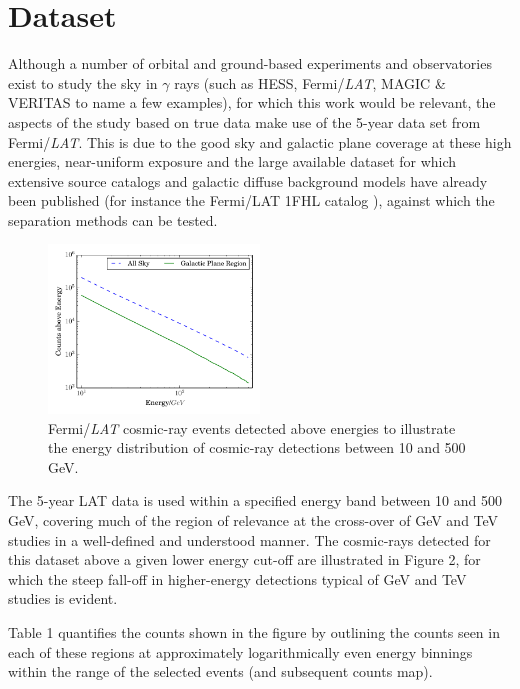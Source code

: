 \documentclass{PoS}
\begin{document}
\section{Dataset}
Although a number of orbital and ground-based experiments and observatories exist to study the sky in $\gamma$ rays (such as HESS, Fermi/\textit{LAT}, MAGIC \& VERITAS to name a few examples), for which this work would be relevant, the aspects of the study based on true data make use of the 5-year data set from Fermi/\textit{LAT}. This is due to the good sky and galactic plane coverage at these high energies, near-uniform exposure and the large available dataset for which extensive source catalogs and galactic diffuse background models have already been published (for instance the Fermi/LAT 1FHL catalog \cite{1fhl}), against which the separation methods can be tested.

\begin{figure}
  \begin{center}
      \includegraphics[width=0.5\textwidth]{figures/counts.pdf}
  \caption{Fermi/\textit{LAT} cosmic-ray events detected above energies to illustrate the energy distribution of cosmic-ray detections between 10 and 500 GeV.}
  \end{center}
\end{figure}

The 5-year LAT data is used within a specified energy band between 10 and 500 GeV, covering much of the region of relevance at the cross-over of GeV and TeV studies in a well-defined and understood manner. The cosmic-rays detected for this dataset above a given lower energy cut-off are illustrated in Figure 2, for which the steep fall-off in higher-energy detections typical of GeV and TeV studies is evident.

Table 1 quantifies the counts shown in the figure by outlining the counts seen in each of these regions at approximately logarithmically even energy binnings within the range of the selected events (and subsequent counts map).
\end{document}
